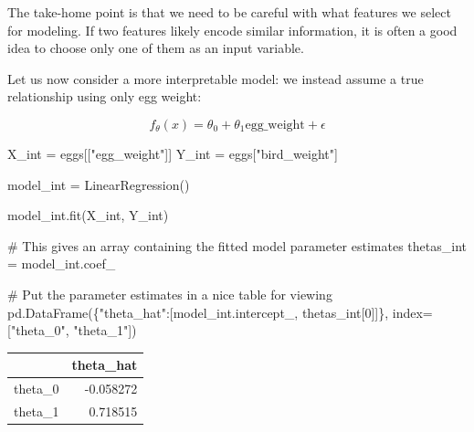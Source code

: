 \documentclass[
  letterpaper,
  DIV=11,
  numbers=noendperiod]{scrreprt}
\newenvironment{Shaded}{\begin{snugshade}}{\end{snugshade}}
\newcommand{\CommentTok}[1]{\textcolor[rgb]{0.37,0.37,0.37}{#1}}
\newcommand{\DecValTok}[1]{\textcolor[rgb]{0.68,0.00,0.00}{#1}}
\newcommand{\NormalTok}[1]{\textcolor[rgb]{0.00,0.23,0.31}{#1}}
\newcommand{\OperatorTok}[1]{\textcolor[rgb]{0.37,0.37,0.37}{#1}}
\newcommand{\StringTok}[1]{\textcolor[rgb]{0.13,0.47,0.30}{#1}}
\begin{document}
The take-home point is that we need to be careful with what features we
select for modeling. If two features likely encode similar information,
it is often a good idea to choose only one of them as an input variable.

Let us now consider a more interpretable model: we instead assume a true
relationship using only egg weight:

\[f_{\theta}(x) = \theta_0 + \theta_1 \text{egg_weight} + \epsilon\]

\begin{Shaded}
\begin{Highlighting}[]
\NormalTok{X\_int }\OperatorTok{=}\NormalTok{ eggs[[}\StringTok{"egg\_weight"}\NormalTok{]]}
\NormalTok{Y\_int }\OperatorTok{=}\NormalTok{ eggs[}\StringTok{"bird\_weight"}\NormalTok{]}

\NormalTok{model\_int }\OperatorTok{=}\NormalTok{ LinearRegression()}

\NormalTok{model\_int.fit(X\_int, Y\_int)}

\CommentTok{\# This gives an array containing the fitted model parameter estimates}
\NormalTok{thetas\_int }\OperatorTok{=}\NormalTok{ model\_int.coef\_}

\CommentTok{\# Put the parameter estimates in a nice table for viewing}
\NormalTok{pd.DataFrame(\{}\StringTok{"theta\_hat"}\NormalTok{:[model\_int.intercept\_, thetas\_int[}\DecValTok{0}\NormalTok{]]\}, index}\OperatorTok{=}\NormalTok{[}\StringTok{"theta\_0"}\NormalTok{, }\StringTok{"theta\_1"}\NormalTok{])}
\end{Highlighting}
\end{Shaded}

\begin{tabular}{lr}
\toprule
{} &  theta\_hat \\
\midrule
theta\_0 &  -0.058272 \\
theta\_1 &   0.718515 \\
\bottomrule
\end{tabular}
\end{document}
